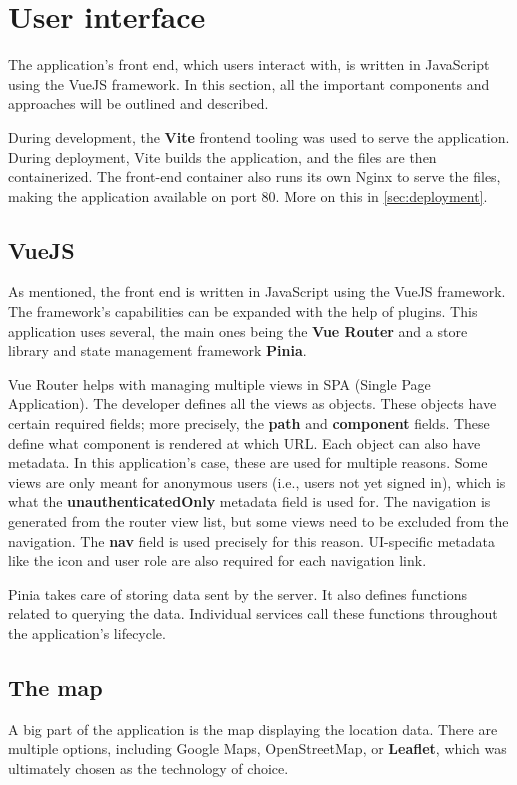 \documentclass[FM,BP,EN,fonts]{tulthesis}
\begin{document}
\newpage

\section{User interface}
\label{sec:front-end}
The application's front end, which users interact with, is written in JavaScript using the VueJS framework. In this section, all the important components and approaches will be outlined and described. 

During development, the \textbf{Vite} frontend tooling was used to serve the application. During deployment, Vite builds the application, and the files are then containerized. The front-end container also runs its own Nginx to serve the files, making the application available on port 80. More on this in \autoref{sec:deployment}.

\subsection{VueJS}
As mentioned, the front end is written in JavaScript using the VueJS framework. The framework's capabilities can be expanded with the help of plugins. This application uses several, the main ones being the \textbf{Vue Router} and a store library and state management framework \textbf{Pinia}.

Vue Router helps with managing multiple views in SPA (Single Page Application). The developer defines all the views as objects. These objects have certain required fields; more precisely, the \textbf{path} and \textbf{component} fields. These define what component is rendered at which URL. Each object can also have metadata. In this application's case, these are used for multiple reasons. Some views are only meant for anonymous users (i.e., users not yet signed in), which is what the \textbf{unauthenticatedOnly} metadata field is used for. The navigation is generated from the router view list, but some views need to be excluded from the navigation. The \textbf{nav} field is used precisely for this reason. UI-specific metadata like the icon and user role are also required for each navigation link.

Pinia takes care of storing data sent by the server. It also defines functions related to querying the data. Individual services call these functions throughout the application's lifecycle.

\subsection{The map}
A big part of the application is the map displaying the location data. There are multiple options, including Google Maps, OpenStreetMap, or \textbf{Leaflet}, which was ultimately chosen as the technology of choice. 
\end{document}
